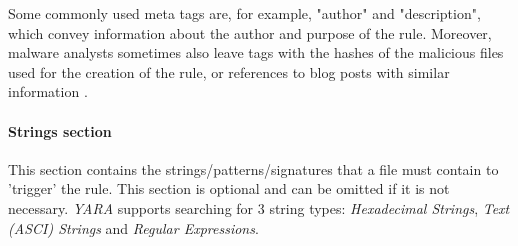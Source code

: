 \documentclass[pdfa%
,cucitura%
]{toptesi}
\begin{document}
Some commonly used meta tags are, for example, "author" and "description", which convey information about the author and purpose of the rule. Moreover, malware analysts sometimes also leave tags with the hashes of the malicious files used for the creation of the rule, or references to blog posts with similar information \cite{SimonWIY}.

\paragraph{Strings section} 
This section contains the strings/patterns/signatures that a file must contain to 'trigger' the rule. This section is optional and can be omitted if it is not necessary. \textit{YARA} supports searching for 3 string types: \textit{Hexadecimal Strings}, \textit{Text (ASCI) Strings} and \textit{Regular Expressions}.
\end{document}
